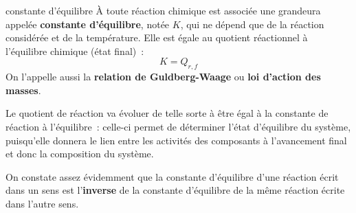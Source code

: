 \documentclass[../main/main.tex]{subfiles}
\begin{document}
\begin{defi}[label=def:K]{constante d'équilibre}
    À toute réaction chimique est associée une grandeura appelée
    \textbf{constante d'équilibre}, notée $K$, qui ne dépend que de la réaction
    considérée et de la température. Elle est égale au quotient réactionnel à
    l'équilibre chimique (état final)~:
    \[\boxed{K = Q_{r, f}}\]
    On l'appelle aussi la \textbf{relation de Guldberg-Waage} ou \textbf{loi
    d'action des masses}.
\end{defi}

Le quotient de réaction va évoluer de telle sorte à être égal à la constante de
réaction à l'équilibre~: celle-ci permet de déterminer l'état d'équilibre du
système, puisqu'elle donnera le lien entre les activités des composants à
l'avancement final et donc la composition du système.

On constate assez évidemment que la constante d'équilibre d'une réaction écrit
dans un sens est l'\textbf{inverse} de la constante d'équilibre de la même
réaction écrite dans l'autre sens.
\end{document}
